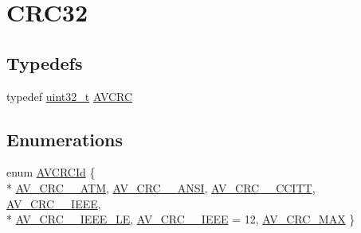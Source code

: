 \hypertarget{group__lavu__crc32}{}\section{C\+R\+C32}
\label{group__lavu__crc32}
\subsection*{Typedefs}
\begin{DoxyCompactItemize}
\item 
typedef \hyperlink{lib-src_2ffmpeg_2win32_2stdint_8h_a6eb1e68cc391dd753bc8ce896dbb8315}{uint32\+\_\+t} \hyperlink{group__lavu__crc32_gad7b1134679f68f2d4a52edaf1441e38f}{A\+V\+C\+RC}
\end{DoxyCompactItemize}
\subsection*{Enumerations}
\begin{DoxyCompactItemize}
\item 
enum \hyperlink{group__lavu__crc32_gab7717a9f1179a5ac8516982f9f2997d2}{A\+V\+C\+R\+C\+Id} \{ \\*
\hyperlink{group__lavu__crc32_ggab7717a9f1179a5ac8516982f9f2997d2a892e48b7e846baeefd1b55a955f5cc66}{A\+V\+\_\+\+C\+R\+C\+\_\+\_\+\+A\+TM}, 
\hyperlink{group__lavu__crc32_ggab7717a9f1179a5ac8516982f9f2997d2ae71c422e08cb83214c438ec352799e75}{A\+V\+\_\+\+C\+R\+C\+\_\+\_\+\+A\+N\+SI}, 
\hyperlink{group__lavu__crc32_ggab7717a9f1179a5ac8516982f9f2997d2a0e915db19602a96b5a83a953fd169a95}{A\+V\+\_\+\+C\+R\+C\+\_\+\_\+\+C\+C\+I\+TT}, 
\hyperlink{group__lavu__crc32_ggab7717a9f1179a5ac8516982f9f2997d2a2c95e44f51d497669d7c49d58018dea1}{A\+V\+\_\+\+C\+R\+C\+\_\+\_\+\+I\+E\+EE}, 
\\*
\hyperlink{group__lavu__crc32_ggab7717a9f1179a5ac8516982f9f2997d2aa43f268d15303373c90287522a4d4752}{A\+V\+\_\+\+C\+R\+C\+\_\+\_\+\+I\+E\+E\+E\+\_\+\+LE}, 
\hyperlink{group__lavu__crc32_ggab7717a9f1179a5ac8516982f9f2997d2a317de029f3dce59427fe4681c5a8af2a}{A\+V\+\_\+\+C\+R\+C\+\_\+\_\+\+I\+E\+EE} = 12, 
\hyperlink{group__lavu__crc32_ggab7717a9f1179a5ac8516982f9f2997d2ac72372c57b632a072de910c789ad08ee}{A\+V\+\_\+\+C\+R\+C\+\_\+\+M\+AX}
 \}
\end{DoxyCompactItemize}
